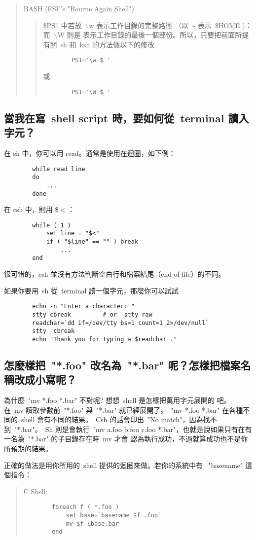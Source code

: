 \documentclass{article}
\begin{document}
\begin{CJK*}{Bg5}{ming}
\begin{quote}
	BASH (FSF's "Bourne Again Shell")
	\begin{quote}
	  \$PS1 中若放~$\backslash$w 表示工作目錄的完整路徑
	（以~\verb+~+ 表示~\$HOME )： 而~$\backslash$W 則是
	表示工作目錄的最後一個部份。所以，只要把前面所提
	  有關~sh 和~ksh 的方法做以下的修改
\begin{verbatim}
		PS1='\w $ ' 
\end{verbatim}
	  或
\begin{verbatim}
		PS1='\W $ '
\end{verbatim}
	\end{quote}
\end{quote}

\subsection{當我在寫~shell script 時，要如何從~terminal 讀入字元？}

	在 sh 中，你可以用 read。通常是使用在迴圈，如下例：
\begin{verbatim}
		while read line
		do
		    ...
		done
\end{verbatim}
	在 csh 中，則用 \$$<$：
\begin{verbatim}
		while ( 1 )
		    set line = "$<"
		    if ( "$line" == "" ) break
		        ...
		end
\end{verbatim}
	很可惜的，csh 並沒有方法判斷空白行和檔案結尾（end-of-file）的不同。

	如果你要用~sh 從~terminal 讀一個字元，那麼你可以試試
\begin{verbatim}
		echo -n "Enter a character: "
		stty cbreak         # or  stty raw
		readchar=`dd if=/dev/tty bs=1 count=1 2>/dev/null`
		stty -cbreak
		echo "Thank you for typing a $readchar ."
\end{verbatim}

\subsection{怎麼樣把~"*.foo" 改名為~"*.bar" 呢？怎樣把檔案名稱改成小寫呢？}

	為什麼~"mv *.foo *.bar" 不對呢? 想想~shell 是怎樣把萬用字元展開的
	吧。 在~mv 讀取參數前~"*.foo" 與~"*.bar" 就已經展開了。~"mv *.foo 
	*.bar" 在各種不同的~shell 會有不同的結果。~Csh 的話會印出~"No 
	match"，因為找不到~"*.bar"。~Sh 則是會執行~"mv a.foo b.foo c.foo 
	*.bar"，也就是說如果只有在有一名為~"*.bar" 的子目錄存在時~mv 才會
	認為執行成功，不過就算成功也不是你所預期的結果。

	正確的做法是用你所用的~shell 提供的迴圈來做。若你的系統中有 
	~"basename" 這個指令：
\begin{quote}
	C Shell:
\begin{verbatim}
		foreach f ( *.foo )
		    set base=`basename $f .foo`
		    mv $f $base.bar
		end
\end{verbatim}


\end{quote}
\end{CJK*}
\end{document}
